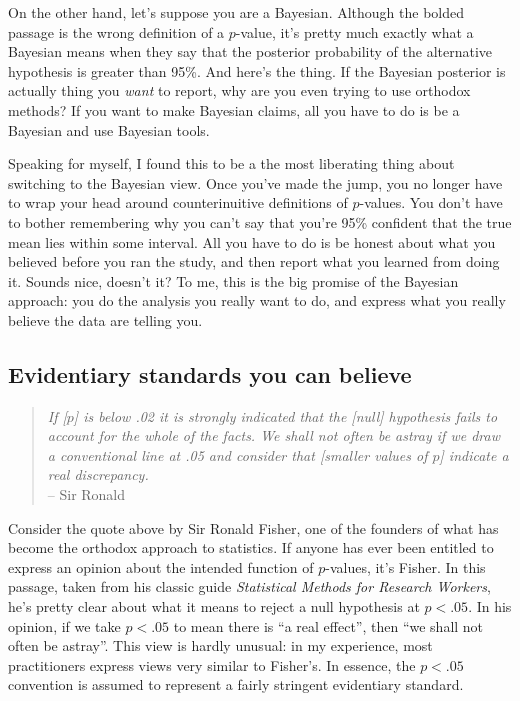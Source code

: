 On the other hand, let's suppose you are a Bayesian. Although the bolded passage is the wrong definition of a $p$-value, it's pretty much exactly what a Bayesian means when they say that the posterior probability of the alternative hypothesis is greater than 95\%. And here's the thing. If the Bayesian posterior is actually thing you {\it want} to report, why are you even trying to use orthodox methods? If you want to make Bayesian claims, all you have to do is be a Bayesian and use Bayesian tools. 

Speaking for myself, I found this to be a the most liberating thing about switching to the Bayesian view. Once you've made the jump, you no longer have to wrap your head around counterinuitive definitions of $p$-values. You don't have to bother remembering why you can't say that you're 95\% confident that the true mean lies within some interval. All you have to do is be honest about what you believed before you ran the study, and then report what you learned from doing it. Sounds nice, doesn't it? To me, this is the big promise of the Bayesian approach: you do the analysis you really want to do, and express what you really believe the data are telling you.



\subsection{Evidentiary standards you can believe}



\begin{quote}
{\it If [$p$] is below .02 it is strongly indicated that the [null] hypothesis fails to account for the whole of the facts. We shall not often be astray if we draw a conventional line at .05 and consider that [smaller values of $p$] indicate a real discrepancy.}\\
\hspace*{2cm} -- Sir Ronald \textcite{Fisher1925}
\end{quote}


Consider the quote above by Sir Ronald Fisher, one of the founders of what has become the orthodox approach to statistics. If anyone has ever been entitled to express an opinion about the intended function of $p$-values, it's Fisher. In this passage, taken from his classic guide {\it Statistical Methods for Research Workers}, he's pretty clear about what it means to reject a null hypothesis at $p<.05$. In his opinion, if we take $p<.05$ to mean there is ``a real effect'', then ``we shall not often be astray''. This view is hardly unusual: in my experience, most practitioners express views very similar to Fisher's. In essence, the $p<.05$ convention is assumed to represent a fairly stringent evidentiary standard.

